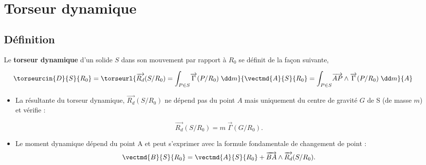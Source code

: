 %
%
%


\section{Torseur dynamique}
\subsection{Définition}
\begin{definition}%
Le \textbf{torseur dynamique} d'un solide $S$ dans son mouvement par rapport à $R_0$ se définit de la façon suivante,

$$
\torseurcin{D}{S}{R_0}=\torseurl{\overrightarrow{R_d}(S/R_0)=\displaystyle{\int_{P\in S}}\overrightarrow{\Gamma}(P/R_0)\;\dd m}{\vectmd{A}{S}{R_0}=\displaystyle{\int_{P\in S}}\overrightarrow{AP}\wedge \overrightarrow{\Gamma}(P/R_0)\;\dd m}{A}
$$

\begin{itemize}
\item La résultante du torseur dynamique, $\overrightarrow{R_d}(S/R_0)$ ne dépend pas du point $A$ mais uniquement du centre de gravité $G$ de S (de masse $m$) et vérifie :

$$\overrightarrow{R_d}(S/R_0)=m\;\overrightarrow{\Gamma}(G/R_0).
$$
\item Le moment dynamique dépend du point A et peut s'exprimer avec la formule fondamentale de changement de point :
$$
\vectmd{B}{S}{R_0}=\vectmd{A}{S}{R_0}+\overrightarrow{BA}\wedge \overrightarrow{R_d}(S/R_0).
$$
\end{itemize}

\end{definition}



